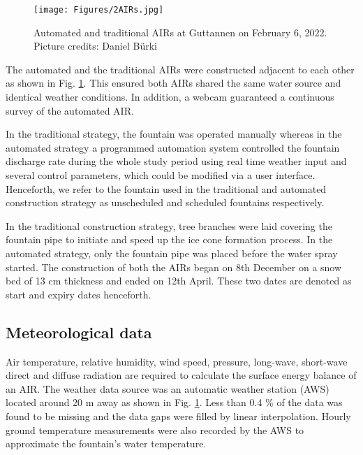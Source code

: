 \documentclass[tc, manuscript]{copernicus}
\begin{document}
\begin{figure}[t]
\texttt{[image: Figures/2AIRs.jpg]}
\caption{Automated and traditional AIRs at Guttannen on February 6, 2022. Picture credits: Daniel Bürki}
\label{fig:2AIR}
\end{figure}

The automated and the traditional AIRs were constructed adjacent to each other as shown in Fig. \ref{fig:2AIR}.
This ensured both AIRs shared the same water source and identical weather conditions. In addition, a webcam
guaranteed a continuous survey of the automated AIR.   

In the traditional strategy, the fountain was operated manually whereas in the automated strategy a programmed
automation system controlled the fountain discharge rate during the whole study period using real time weather
input and several control parameters, which could be modified via a user interface. Henceforth, we refer to the
fountain used in the traditional and automated construction strategy as unscheduled and scheduled fountains
respectively.

In the traditional construction strategy, tree branches were laid covering the fountain pipe to initiate and
speed up the ice cone formation process. In the automated strategy, only the fountain pipe was placed before the
water spray started. The construction of both the AIRs began on 8th December on a snow bed of 13 cm thickness
and ended on 12th April. These two dates are denoted as start and expiry dates henceforth.

\subsection{Meteorological data}

Air temperature, relative humidity, wind speed, pressure, long-wave, short-wave direct and diffuse radiation are
required to calculate the surface energy balance of an AIR.  The weather data source was an automatic weather
station (AWS) located around 20 m away as shown in Fig. \ref{fig:2AIR}. Less than 0.4 \% of the data was found
to be missing and the data gaps were filled by linear interpolation. Hourly ground temperature measurements were
also recorded by the AWS to approximate the fountain's water temperature. 
\end{document}
